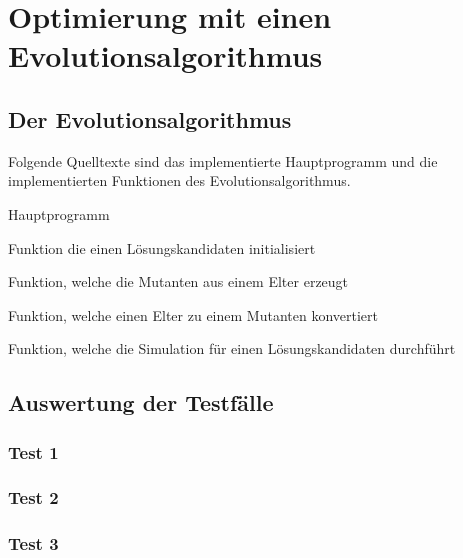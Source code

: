 \section{Optimierung mit einen Evolutionsalgorithmus}
\subsection{Der Evolutionsalgorithmus}
Folgende Quelltexte sind das implementierte Hauptprogramm und die implementierten Funktionen des Evolutionsalgorithmus.

\begin{code}
	\caption{Hauptprogramm}
	\label{fig:moon-landing-m}
\end{code}

\begin{code}
	\caption{Funktion die einen Lösungskandidaten initialisiert}
	\label{fig:initialize-m}
\end{code}

\begin{code}
\caption{Funktion, welche die Mutanten aus einem Elter erzeugt}
\label{fig:bread-m}
\end{code}

\begin{code}
\caption{Funktion, welche einen Elter zu einem Mutanten konvertiert}
\label{fig:mutate-m}
\end{code}

\begin{code}
\caption{Funktion, welche die Simulation für einen Lösungskandidaten durchführt}
\label{fig:evaluate-m}
\end{code}
\newpage

\subsection{Auswertung der Testfälle}
\subsubsection{Test 1}

\subsubsection{Test 2}

\subsubsection{Test 3}


